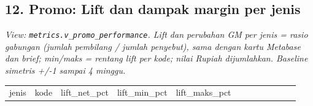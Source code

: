 \documentclass[10pt,a4paper]{article}
\begin{document}
\subsection{12. Promo: Lift dan dampak margin per jenis}\label{promo-lift-dan-dampak-margin-per-jenis}

\emph{View: \texttt{metrics.v\_\allowbreak{}promo\_\allowbreak{}performance}. Lift dan perubahan GM per jenis = rasio gabungan (jumlah pembilang / jumlah penyebut), sama dengan kartu Metabase dan brief; min/maks = rentang lift per kode; nilai Rupiah dijumlahkan. Baseline simetris +/-1 sampai 4 minggu.}

{\def\LTcaptype{none} %
\begin{longtable}[]{@{}
  >{\raggedright\arraybackslash}p{}
  >{\raggedleft\arraybackslash}p{}
  >{\raggedleft\arraybackslash}p{}
  >{\raggedleft\arraybackslash}p{}
  >{\raggedleft\arraybackslash}p{}
  >{\raggedleft\arraybackslash}p{}
  >{\raggedleft\arraybackslash}p{}
  >{\raggedleft\arraybackslash}p{}
  >{\raggedleft\arraybackslash}p{}
  >{\raggedleft\arraybackslash}p{}
  >{\raggedleft\arraybackslash}p{}
  >{\raggedleft\arraybackslash}p{}@{}}
\toprule\noalign{}
\begin{minipage}[b]{\linewidth}\raggedright
jenis
\end{minipage} & \begin{minipage}[b]{\linewidth}\raggedleft
kode
\end{minipage} & \begin{minipage}[b]{\linewidth}\raggedleft
lift\_\allowbreak{}net\_\allowbreak{}pct
\end{minipage} & \begin{minipage}[b]{\linewidth}\raggedleft
lift\_\allowbreak{}min\_\allowbreak{}pct
\end{minipage} & \begin{minipage}[b]{\linewidth}\raggedleft
lift\_\allowbreak{}maks\_\allowbreak{}pct
\end{minipage} & \begin{minipage}[b]{\linewidth}\raggedleft

\end{minipage}
\end{longtable}}
\end{document}
